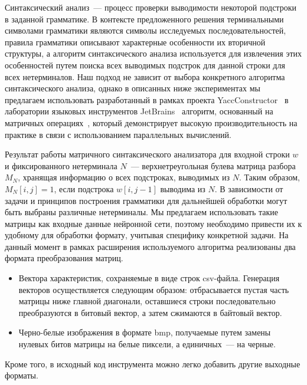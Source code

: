 Синтаксический анализ~--- процесс проверки выводимости некоторой подстроки в заданной грамматике. В контексте предложенного решения терминальными символами грамматики являются символы исследуемых последовательностей, правила грамматики описывают характерные особенности их вторичной структуры, а алгоритм синтаксического анализа используется для извлечения этих особенностей путем поиска всех выводимых подстрок для данной строки для всех нетерминалов. Наш подход не зависит от выбора конкретного алгоритма синтаксического анализа, однако в описанных ниже экспериментах мы предлагаем использовать разработанный в рамках проекта YaccConstructor~\cite{yacc} в лаборатории языковых инструментов JetBrains~\cite{jetbrains} алгоритм, основанный на матричных операциях~\cite{Azimov:2018:CPQ:3210259.3210264}, который демонстрирует высокую производительность на практике в связи с использованием параллельных вычислений.

Результат работы матричного синтаксического анализатора для входной строки $w$ и фиксированного нетерминала  $N$~--- верхнетреугольная булева матрица разбора $M_N$, хранящая информацию о всех подстроках, выводимых из $N$. Таким образом, $M_N[i,j]=1$, если подстрока $w[i,j-1]$  выводима из $N$. В зависимости от задачи и принципов построения грамматики для дальнейшей обработки могут быть выбраны различные нетерминалы. Мы предлагаем использовать такие матрицы как входные данные нейронной сети, поэтому необходимо привести их к удобному для обработки формату, учитывая специфику конкретной задачи. На данный момент в рамках расширения используемого алгоритма реализованы два формата преобразования матриц.
\begin{itemize}
    \item Вектора характеристик, сохраняемые в виде строк csv-файла. Генерация векторов осуществляется следующим образом: отбрасывается пустая часть матрицы ниже главной диагонали, оставшиеся строки последовательно преобразуются в битовый вектор, а затем сжимаются в байтовый вектор.
    \item Черно-белые изображения в формате bmp, получаемые путем замены нулевых битов матрицы на белые пиксели, а единичных~--- на черные.
\end{itemize}
Кроме того, в исходный код инструмента можно легко добавить другие выходные форматы.

